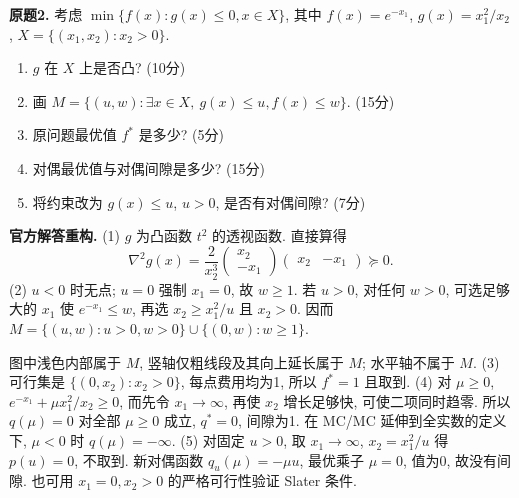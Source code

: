\begin{exercise}\label{ass:6253-exam2010-q2}
\textbf{原题2.} 考虑 $\min\{f(x):g(x)\le0,x\in X\}$, 其中
$f(x)=e^{-x_1}$, $g(x)=x_1^2/x_2$, $X=\{(x_1,x_2):x_2>0\}$.
\begin{enumerate}[label=(\arabic*)]
\item $g$ 在 $X$ 上是否凸? (10分)
\item 画 $M=\{(u,w):\exists x\in X,\ g(x)\le u,f(x)\le w\}$. (15分)
\item 原问题最优值 $f^*$ 是多少? (5分)
\item 对偶最优值与对偶间隙是多少? (15分)
\item 将约束改为 $g(x)\le u$, $u>0$, 是否有对偶间隙? (7分)
\end{enumerate}
\end{exercise}
\begin{solution}
\textbf{官方解答重构.} (1) $g$ 为凸函数 $t^2$ 的透视函数. 直接算得
\[
\nabla^2g(x)=\frac2{x_2^3}
\begin{pmatrix}x_2\\-x_1\end{pmatrix}
\begin{pmatrix}x_2&-x_1\end{pmatrix}\succeq0.
\]
(2) $u<0$ 时无点; $u=0$ 强制 $x_1=0$, 故 $w\ge1$. 若 $u>0$, 对任何 $w>0$, 可选足够大的 $x_1$ 使 $e^{-x_1}\le w$, 再选 $x_2\ge x_1^2/u$ 且 $x_2>0$. 因而
$M=\{(u,w):u>0,w>0\}\cup\{(0,w):w\ge1\}$.
\begin{center}
\end{center}
图中浅色内部属于 $M$, 竖轴仅粗线段及其向上延长属于 $M$; 水平轴不属于 $M$.
(3) 可行集是 $\{(0,x_2):x_2>0\}$, 每点费用均为1, 所以 $f^*=1$ 且取到.
(4) 对 $\mu\ge0$, $e^{-x_1}+\mu x_1^2/x_2\ge0$, 而先令 $x_1\to\infty$, 再使 $x_2$ 增长足够快, 可使二项同时趋零. 所以 $q(\mu)=0$ 对全部 $\mu\ge0$ 成立, $q^*=0$, 间隙为1. 在 MC/MC 延伸到全实数的定义下, $\mu<0$ 时 $q(\mu)=-\infty$.
(5) 对固定 $u>0$, 取 $x_1\to\infty$, $x_2=x_1^2/u$ 得 $p(u)=0$, 不取到. 新对偶函数 $q_u(\mu)=-\mu u$, 最优乘子 $\mu=0$, 值为0, 故没有间隙. 也可用 $x_1=0,x_2>0$ 的严格可行性验证 Slater 条件.
\end{solution}

